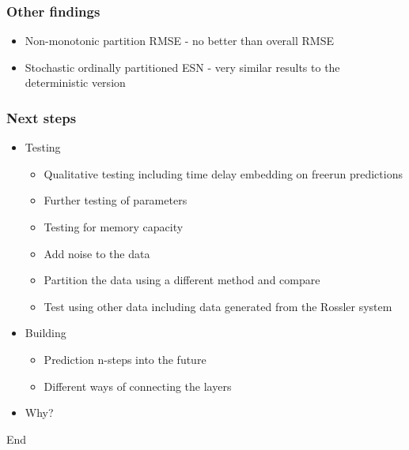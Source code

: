 \documentclass{beamer}
\begin{document}
\begin{frame}
    \frametitle{Other findings}

    \begin{itemize}
        \item Non-monotonic partition RMSE - no better than overall RMSE
        \item Stochastic ordinally partitioned ESN - very similar results to the deterministic version
    \end{itemize}
\end{frame}

\begin{frame}
    \frametitle{Next steps}

    \begin{itemize}
        \item Testing
        \begin{itemize}
            \item Qualitative testing including time delay embedding on freerun predictions
            \item Further testing of parameters
            \item Testing for memory capacity
            \item Add noise to the data
            \item Partition the data using a different method and compare
            \item Test using other data including data generated from the Rossler system
        \end{itemize}
        \item Building
        \begin{itemize}
            \item Prediction n-steps into the future
            \item Different ways of connecting the layers
        \end{itemize}
        \item Why?
    \end{itemize}
\end{frame}

\begin{frame}
    End
\end{frame}
\end{document}
